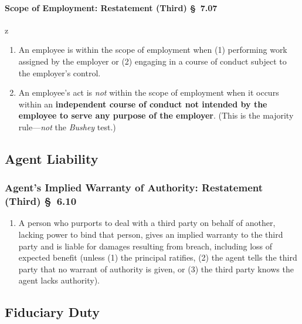 \paragraph{Scope of Employment: Restatement (Third) \S\ 7.07}
z
\begin{enumerate}
    \item An employee is within the scope of employment when (1) performing 
    work assigned by the employer or (2) engaging in a course of conduct 
    subject to the employer's control.
    \item An employee's act is \emph{not} within the scope of employment when 
    it occurs within an \textbf{independent course of conduct not intended by 
    the employee to serve any purpose of the employer}. (This is the majority 
    rule---\emph{not} the \emph{Bushey} test.)
\end{enumerate}


\subsection{Agent Liability}

\subsubsection{Agent's Implied Warranty of Authority: Restatement (Third) \S\ 
6.10}

\begin{enumerate}
    \item A person who purports to deal with a third party on behalf of 
    another, lacking power to bind that person, gives an implied warranty to 
    the third party and is liable for damages resulting from breach, including 
    loss of expected benefit (unless (1) the principal ratifies, (2) the agent 
    tells the third party that no warrant of authority is given, or (3) the 
    third party knows the agent lacks authority).
\end{enumerate}

\subsection{Fiduciary Duty}

